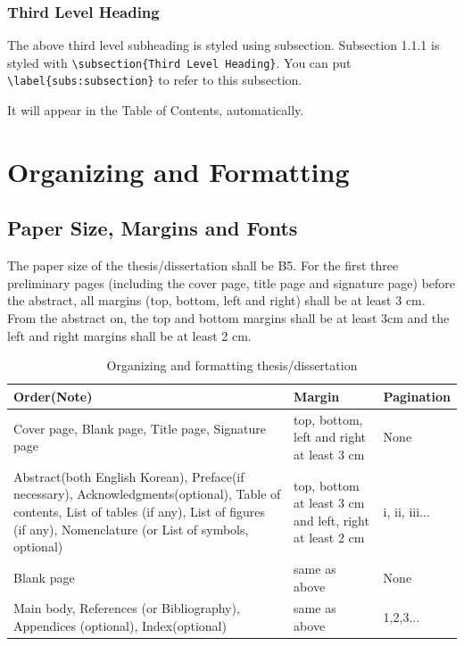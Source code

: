 \documentclass[11pt]{report}
\numberwithin{figure}{section}
\theoremstyle{plain}
\theoremstyle{definition}
\theoremstyle{corollary}
\theoremstyle{definition}
\theoremstyle{plain}
\theoremstyle{definition}
\theoremstyle{plain}
\begin{document}
\subsection{Third Level Heading}\label{subs:subsection}
The above third level subheading is styled using subsection.
Subsection 1.1.1 is styled with \verb|\subsection{Third Level Heading}|.
You can put \\\verb|\label{subs:subsection}| to refer to this subsection.

It will appear in the Table of Contents, automatically.

\chapter{Organizing and Formatting}\label{chap:organizing}

\section{Paper Size, Margins and Fonts} \label{sec:papersize}
The paper size of the thesis/dissertation shall be B5.
For the first three preliminary pages (including the cover page, title page and signature page) before the abstract, all margins (top, bottom, left and right) shall be at least 3 cm.
From the abstract on, the top and bottom margins shall be at least 3cm and the left and right margins shall be at least 2 cm.



\begin{table}
\caption{Organizing and formatting thesis/dissertation}
\vspace{0.5cm}
\begin{tabular}{ m{7cm} m{3cm} m{2cm}}
\hline
Order(Note) & Margin & Pagination \\\hline
Cover page, Blank page, Title page,    Signature page   &	 top, bottom, left  and right at least 3 cm	&	None \\\hline
Abstract(both English Korean), Preface(if necessary), Acknowledgments(optional), Table of contents, List of tables (if any), List of figures (if any), Nomenclature (or List of symbols, optional)	& top, bottom at least 3 cm and left, right at least 2 cm  &  i, ii, iii...         \\\hline		
Blank page & same as above  & None \\\hline
Main body, References (or Bibliography), Appendices (optional), Index(optional) & same as above  & 1,2,3...	\\\hline

\end{tabular}
\end{table}
\end{document}
